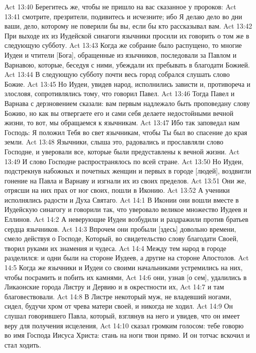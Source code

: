 Act 13:40  Берегитесь же, чтобы не пришло на вас сказанное у пророков:
Act 13:41  смотрите, презрители, подивитесь и исчезните; ибо Я делаю дело во дни ваши, дело, которому не поверили бы вы, если бы кто рассказывал вам.
Act 13:42  При выходе их из Иудейской синагоги язычники просили их говорить о том же в следующую субботу.
Act 13:43  Когда же собрание было распущено, то многие Иудеи и чтители [Бога], обращенные из язычников, последовали за Павлом и Варнавою, которые, беседуя с ними, убеждали их пребывать в благодати Божией.
Act 13:44  В следующую субботу почти весь город собрался слушать слово Божие.
Act 13:45  Но Иудеи, увидев народ, исполнились зависти и, противореча и злословя, сопротивлялись тому, что говорил Павел.
Act 13:46  Тогда Павел и Варнава с дерзновением сказали: вам первым надлежало быть проповедану слову Божию, но как вы отвергаете его и сами себя делаете недостойными вечной жизни, то вот, мы обращаемся к язычникам.
Act 13:47  Ибо так заповедал нам Господь: Я положил Тебя во свет язычникам, чтобы Ты был во спасение до края земли.
Act 13:48  Язычники, слыша это, радовались и прославляли слово Господне, и уверовали все, которые были предуставлены к вечной жизни.
Act 13:49  И слово Господне распространялось по всей стране.
Act 13:50  Но Иудеи, подстрекнув набожных и почетных женщин и первых в городе [людей], воздвигли гонение на Павла и Варнаву и изгнали их из своих пределов.
Act 13:51  Они же, отрясши на них прах от ног своих, пошли в Иконию.
Act 13:52  А ученики исполнялись радости и Духа Святаго.
Act 14:1  В Иконии они вошли вместе в Иудейскую синагогу и говорили так, что уверовало великое множество Иудеев и Еллинов.
Act 14:2  А неверующие Иудеи возбудили и раздражили против братьев сердца язычников.
Act 14:3  Впрочем они пробыли [здесь] довольно времени, смело действуя о Господе, Который, во свидетельство слову благодати Своей, творил руками их знамения и чудеса.
Act 14:4  Между тем народ в городе разделился: и одни были на стороне Иудеев, а другие на стороне Апостолов.
Act 14:5  Когда же язычники и Иудеи со своими начальниками устремились на них, чтобы посрамить и побить их камнями,
Act 14:6  они, узнав [о сем], удалились в Ликаонские города Листру и Дервию и в окрестности их,
Act 14:7  и там благовествовали.
Act 14:8  В Листре некоторый муж, не владевший ногами, сидел, будучи хром от чрева матери своей, и никогда не ходил.
Act 14:9  Он слушал говорившего Павла, который, взглянув на него и увидев, что он имеет веру для получения исцеления,
Act 14:10  сказал громким голосом: тебе говорю во имя Господа Иисуса Христа: стань на ноги твои прямо. И он тотчас вскочил и стал ходить.
